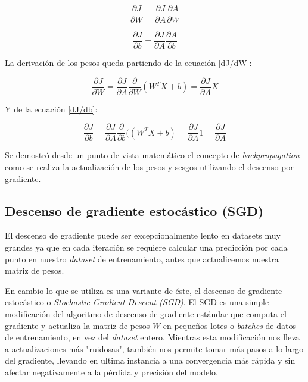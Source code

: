 \documentclass[a4paper,12pt]{article}
\begin{document}
\begin{equation}
	\frac{\partial J}{\partial W} = \frac{\partial J}{\partial A} \frac{\partial A}{\partial W}
	\label{dJ/dW}
\end{equation}

\begin{equation}
	\frac{\partial J}{\partial b} = \frac{\partial J}{\partial A} \frac{\partial A}{\partial b}
	\label{dJ/db}
\end{equation}

La derivación de los pesos queda partiendo de la ecuación \ref{dJ/dW}:

\begin{equation}
	\frac{\partial J}{\partial W} = \frac{\partial J}{\partial A} \frac{\partial}{\partial W}(W^T X + b) = \frac{\partial J}{\partial A} X
\end{equation}

Y de la ecuación \ref{dJ/db}:

\begin{equation}
	\frac{\partial J}{\partial b} = \frac{\partial J}{\partial A} \frac{\partial}{\partial b}((W^T X + b) = \frac{\partial J}{\partial A} 1 = \frac{\partial J}{\partial A}
\end{equation}

Se demostró desde un punto de vista matemático el concepto de \textit{backpropagation} como se realiza la actualización de los pesos y sesgos utilizando el descenso por gradiente.

\clearpage

\subsection{Descenso de gradiente estocástico (SGD)}
El descenso de gradiente puede ser excepcionalmente lento en datasets muy grandes ya que en cada iteración se requiere calcular una predicción por cada punto en nuestro \textit{dataset} de entrenamiento, antes que actualicemos nuestra matriz de pesos.

En cambio lo que se utiliza es una variante de éste, el descenso de gradiente estocástico o \textit{Stochastic Gradient Descent (SGD)}.
El SGD es una simple modificación del algoritmo de descenso de gradiente estándar que computa el gradiente y actualiza la matriz de pesos $W$ en pequeños lotes o \textit{batches} de datos de entrenamiento, en vez del \textit{dataset} entero. Mientras esta modificación nos lleva a actualizaciones más "ruidosas", también nos permite tomar más pasos a lo largo del gradiente, llevando en ultima instancia a una convergencia más rápida y sin afectar negativamente a la pérdida y precisión del modelo.
\end{document}
